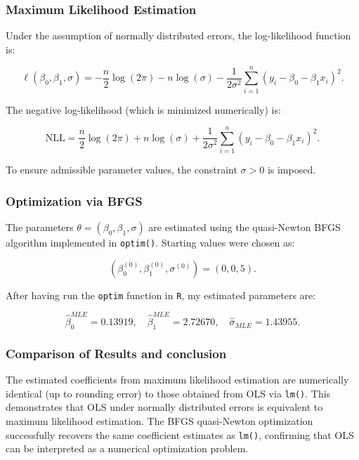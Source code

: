 \documentclass[12pt,letterpaper]{article}
\begin{document}
\subsubsection*{Maximum Likelihood Estimation}

Under the assumption of normally distributed errors, the log-likelihood function is:

\[
\ell(\beta_0,\beta_1,\sigma)
=
-\frac{n}{2}\log(2\pi)
- n\log(\sigma)
-\frac{1}{2\sigma^2}
\sum_{i=1}^n (y_i - \beta_0 - \beta_1 x_i)^2.
\]

The negative log-likelihood (which is minimized numerically) is:

\[
\text{NLL}
=
\frac{n}{2}\log(2\pi)
+ n\log(\sigma)
+ \frac{1}{2\sigma^2}
\sum_{i=1}^n (y_i - \beta_0 - \beta_1 x_i)^2.
\]

To ensure admissible parameter values, the constraint $\sigma > 0$ is imposed.

\subsubsection*{Optimization via BFGS}

The parameters $\theta = (\beta_0, \beta_1, \sigma)$ are estimated using the quasi-Newton BFGS algorithm implemented in \texttt{optim()}. Starting values were chosen as:

\[
(\beta_0^{(0)}, \beta_1^{(0)}, \sigma^{(0)}) = (0, 0, 5).
\]

After having run the \texttt{optim} function in \texttt{R}, my estimated parameters are:

\[
\hat{\beta}_0^{MLE} = 0.13919,
\quad
\hat{\beta}_1^{MLE} = 2.72670,
\quad
\hat{\sigma}_{MLE} = 1.43955.
\]

\subsubsection*{Comparison of Results and conclusion}

The estimated coefficients from maximum likelihood estimation are numerically identical (up to rounding error) to those obtained from OLS via \texttt{lm()}. This demonstrates that OLS under normally distributed errors is equivalent to maximum likelihood estimation. The BFGS quasi-Newton optimization successfully recovers the same coefficient estimates as \texttt{lm()}, confirming that OLS can be interpreted as a numerical optimization problem.
\end{document}
